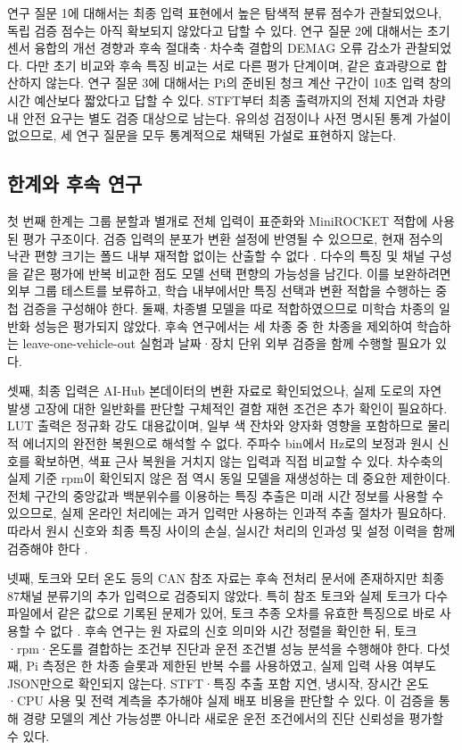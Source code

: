 \documentclass[11pt,a4paper]{article}
\newcommand{\sourceproject}{\citep{project2026}}
\begin{document}
연구 질문 1에 대해서는 최종 입력 표현에서 높은 탐색적 분류 점수가 관찰되었으나, 독립 검증 점수는 아직 확보되지 않았다고 답할 수 있다.
연구 질문 2에 대해서는 초기 센서 융합의 개선 경향과 후속 절대축·차수축 결합의 DEMAG 오류 감소가 관찰되었다.
다만 초기 비교와 후속 특징 비교는 서로 다른 평가 단계이며, 같은 효과량으로 합산하지 않는다.
연구 질문 3에 대해서는 Pi의 준비된 청크 계산 구간이 10초 입력 창의 시간 예산보다 짧았다고 답할 수 있다.
STFT부터 최종 출력까지의 전체 지연과 차량 내 안전 요구는 별도 검증 대상으로 남는다.
유의성 검정이나 사전 명시된 통계 가설이 없으므로, 세 연구 질문을 모두 통계적으로 채택된 가설로 표현하지 않는다.

\subsection{한계와 후속 연구}
첫 번째 한계는 그룹 분할과 별개로 전체 입력이 표준화와 MiniROCKET 적합에 사용된 평가 구조이다.
검증 입력의 분포가 변환 설정에 반영될 수 있으므로, 현재 점수의 낙관 편향 크기는 폴드 내부 재적합 없이는 산출할 수 없다 \citep{sklearn2026}.
다수의 특징 및 채널 구성을 같은 평가에 반복 비교한 점도 모델 선택 편향의 가능성을 남긴다.
이를 보완하려면 외부 그룹 테스트를 보류하고, 학습 내부에서만 특징 선택과 변환 적합을 수행하는 중첩 검증을 구성해야 한다.
둘째, 차종별 모델을 따로 적합하였으므로 미학습 차종의 일반화 성능은 평가되지 않았다.
후속 연구에서는 세 차종 중 한 차종을 제외하여 학습하는 leave-one-vehicle-out 실험과 날짜·장치 단위 외부 검증을 함께 수행할 필요가 있다.

셋째, 최종 입력은 AI-Hub 본데이터의 변환 자료로 확인되었으나, 실제 도로의 자연 발생 고장에 대한 일반화를 판단할 구체적인 결함 재현 조건은 추가 확인이 필요하다.
LUT 출력은 정규화 강도 대용값이며, 일부 색 잔차와 양자화 영향을 포함하므로 물리적 에너지의 완전한 복원으로 해석할 수 없다.
주파수 bin에서 Hz로의 보정과 원시 신호를 확보하면, 색표 근사 복원을 거치지 않는 입력과 직접 비교할 수 있다.
차수축의 실제 기준 rpm이 확인되지 않은 점 역시 동일 모델을 재생성하는 데 중요한 제한이다.
전체 구간의 중앙값과 백분위수를 이용하는 특징 추출은 미래 시간 정보를 사용할 수 있으므로, 실제 온라인 처리에는 과거 입력만 사용하는 인과적 추출 절차가 필요하다.
따라서 원시 신호와 최종 특징 사이의 손실, 실시간 처리의 인과성 및 설정 이력을 함께 검증해야 한다 \sourceproject.

넷째, 토크와 모터 온도 등의 CAN 참조 자료는 후속 전처리 문서에 존재하지만 최종 87채널 분류기의 추가 입력으로 검증되지 않았다.
특히 참조 토크와 실제 토크가 다수 파일에서 같은 값으로 기록된 문제가 있어, 토크 추종 오차를 유효한 특징으로 바로 사용할 수 없다 \sourceproject.
후속 연구는 원 자료의 신호 의미와 시간 정렬을 확인한 뒤, 토크·rpm·온도를 결합하는 조건부 진단과 운전 조건별 성능 분석을 수행해야 한다.
다섯째, Pi 측정은 한 차종 슬롯과 제한된 반복 수를 사용하였고, 실제 입력 사용 여부도 JSON만으로 확인되지 않는다.
STFT·특징 추출 포함 지연, 냉시작, 장시간 온도·CPU 사용 및 전력 계측을 추가해야 실제 배포 비용을 판단할 수 있다.
이 검증을 통해 경량 모델의 계산 가능성뿐 아니라 새로운 운전 조건에서의 진단 신뢰성을 평가할 수 있다.
\end{document}
